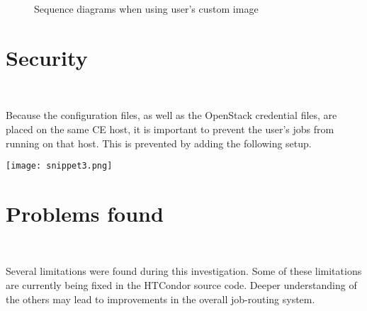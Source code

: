 \documentclass[a4paper]{jpconf}
\begin{document}
\begin{figure}[h]
    \centering
    \qquad
    \caption{Sequence diagrams when using user's custom image}%
    \label{fig:custom}%
\end{figure}


\section{Security}

~

Because the configuration files, as well as the OpenStack credential files, 
are placed on the same CE host, it is important to prevent the user's jobs from running on that host.
This is prevented by adding the following setup.


\begin{snippet}[h]
    \centering
    \renewcommand\figurename{Snippet}
    \texttt{[image: snippet3.png]}
    \caption{Snippet 3}
    \label{fig:snippet3}
\end{snippet}



\section{Problems found}

~

Several limitations were found during this investigation.
Some of these limitations are currently being fixed in the HTCondor source code.
Deeper understanding of the others may lead to improvements in the overall
job-routing system.

~
\end{document}
